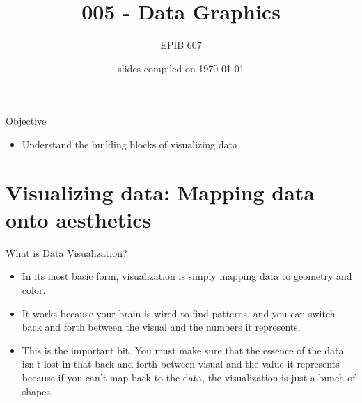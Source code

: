 \documentclass[10pt]{beamer}\usepackage[]{graphicx}\usepackage[]{color}
\begin{document}
	
	
	
	
	\title{005 - Data Graphics}
	\author{EPIB 607}
	
	\date{slides compiled on \today}
	
	\maketitle
	
	\begin{frame}{Objective}
	\begin{itemize}
		\item Understand the building blocks of visualizing data
	\end{itemize}
	\end{frame}
	
	\section{Visualizing data: Mapping data onto aesthetics}
	
		\begin{frame}{What is Data Visualization?}
		\begin{itemize}
			\item In its most basic form, visualization is simply mapping data to geometry and color. 
			\item It works because your brain is wired to find patterns, and you can switch back and forth between the visual and the numbers it represents. 
			\item This is the important bit. You must make sure that the essence of the data isn't lost in that back and forth between visual and the value it represents because if you can't map back to the data, the visualization is just a bunch of shapes.
		\end{itemize}
	\end{frame}
	
\end{document}
